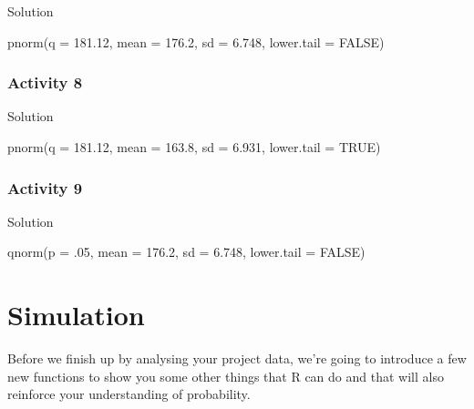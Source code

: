 \documentclass[
  oneside]{book}
\newenvironment{Shaded}{\begin{snugshade}}{\end{snugshade}}
\newcommand{\AttributeTok}[1]{\textcolor[rgb]{0.77,0.63,0.00}{#1}}
\newcommand{\ConstantTok}[1]{\textcolor[rgb]{0.00,0.00,0.00}{#1}}
\newcommand{\DecValTok}[1]{\textcolor[rgb]{0.00,0.00,0.81}{#1}}
\newcommand{\FloatTok}[1]{\textcolor[rgb]{0.00,0.00,0.81}{#1}}
\newcommand{\FunctionTok}[1]{\textcolor[rgb]{0.00,0.00,0.00}{#1}}
\newcommand{\NormalTok}[1]{#1}
\begin{document}
Solution

\begin{Shaded}
\begin{Highlighting}[]
\FunctionTok{pnorm}\NormalTok{(}\AttributeTok{q =} \FloatTok{181.12}\NormalTok{, }\AttributeTok{mean =} \FloatTok{176.2}\NormalTok{, }\AttributeTok{sd =} \FloatTok{6.748}\NormalTok{, }\AttributeTok{lower.tail =} \ConstantTok{FALSE}\NormalTok{)}
\end{Highlighting}
\end{Shaded}

\hypertarget{activity-8-1}{%
\subsection{Activity 8}\label{activity-8-1}}

Solution

\begin{Shaded}
\begin{Highlighting}[]
\FunctionTok{pnorm}\NormalTok{(}\AttributeTok{q =} \FloatTok{181.12}\NormalTok{, }\AttributeTok{mean =} \FloatTok{163.8}\NormalTok{, }\AttributeTok{sd =} \FloatTok{6.931}\NormalTok{, }\AttributeTok{lower.tail =} \ConstantTok{TRUE}\NormalTok{)}
\end{Highlighting}
\end{Shaded}

\hypertarget{activity-9}{%
\subsection{Activity 9}\label{activity-9}}

Solution

\begin{Shaded}
\begin{Highlighting}[]
\FunctionTok{qnorm}\NormalTok{(}\AttributeTok{p =}\NormalTok{ .}\DecValTok{05}\NormalTok{, }\AttributeTok{mean =} \FloatTok{176.2}\NormalTok{, }\AttributeTok{sd =} \FloatTok{6.748}\NormalTok{, }\AttributeTok{lower.tail =} \ConstantTok{FALSE}\NormalTok{)}
\end{Highlighting}
\end{Shaded}

\hypertarget{simulation}{%
\chapter{Simulation}\label{simulation}}

Before we finish up by analysing your project data, we're going to introduce a few new functions to show you some other things that R can do and that will also reinforce your understanding of probability.
\end{document}

